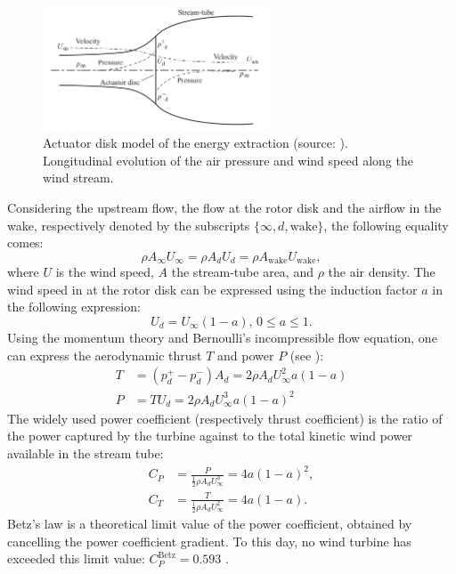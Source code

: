 \begin{figure}[!h]
    \centering
    \includegraphics[width=0.6\textwidth]{./part1/figures/actuator_disk.png}
    \caption{Actuator disk model of the energy extraction (source: \citet{burton_2021_wind_handbook}). Longitudinal evolution of the air pressure and wind speed along the wind stream.}
    \label{fig:actuator_disk}
\end{figure}
Considering the upstream flow, the flow at the rotor disk and the airflow in the wake, respectively denoted by the subscripts $\{\infty, d, \mathrm{wake}\}$, the following equality comes:  
\begin{equation}
    \rho A_\infty U_\infty = \rho A_d U_d = \rho A_{\mathrm{wake}} U_{\mathrm{wake}},
\end{equation}
where $U$ is the wind speed, $A$ the stream-tube area, and $\rho$ the air density. 
The wind speed in at the rotor disk can be expressed using the induction factor $a$ in the following expression: 
\begin{equation}
    U_d = U_\infty (1 - a), \, 0\leq a \leq 1.
\end{equation}
Using the momentum theory and Bernoulli's incompressible flow equation, one can express the aerodynamic thrust $T$ and power $P$ (see \citet{milano_thesis_2021}): 
\begin{subequations}
    \begin{align}
        T&=(p_d^+ - p_d^-) A_d = 2 \rho A_d U_\infty^2 a (1- a)\\
        P&= T U_d = 2 \rho A_d U_\infty^3 a (1- a)^2
    \end{align}
    \label{eq:momentum_theory}
\end{subequations}
The widely used power coefficient (respectively thrust coefficient) is the ratio of the power captured by the turbine against to the total kinetic wind power available in the stream tube: 
\begin{subequations}
    \begin{align}
        C_P &= \frac{P}{\frac12 \rho A_d U_\infty^3} = 4a (1-a)^2,\\
        C_T &= \frac{T}{\frac12 \rho A_d U_\infty^2} = 4a (1-a). 
    \end{align}
\end{subequations} 
Betz's law is a theoretical limit value of the power coefficient, obtained by cancelling the power coefficient gradient. 
To this day, no wind turbine has exceeded this limit value: $C_P^{\mathrm{Betz}} = 0.593$ \citep{burton_2021_wind_handbook}.  



